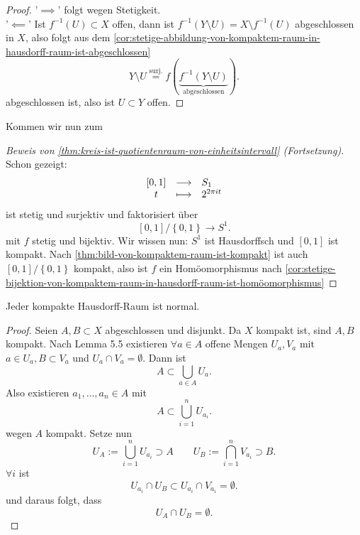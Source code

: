 \begin{proof}
    '$\implies$' folgt wegen Stetigkeit. \\
    '$\impliedby$' Ist $f^{-1}(U) \subset X$ offen, dann ist $f^{-1}(Y \setminus U ) = X \setminus f^{-1}(U)$ abgeschlossen in $X$, also folgt aus dem \autoref{cor:stetige-abbildung-von-kompaktem-raum-in-hausdorff-raum-ist-abgeschlossen}
     \[
         Y \setminus U \stackrel{\text{surj.}}{=}   f\left( \underbrace{f^{-1}\left( Y \setminus U \right)}_{\text{abgeschlossen}}  \right) 
    .\] 
    abgeschlossen ist, also ist $U\subset Y$ offen.
\end{proof}
Kommen wir nun zum
\begin{proof}[Beweis von \autoref{thm:kreis-ist-quotientenraum-von-einheitsintervall} (Fortsetzung)]
    Schon gezeigt:
        \begin{equation*}
        \begin{array}{c c l} 
            [0,1] & \longrightarrow & S_1 \\
        t & \longmapsto &  2^{2\pi it}
        \end{array}
    \end{equation*}
    ist stetig und surjektiv und faktorisiert über
    \[
        [0,1] /\left \{0,1\right\}  \to  S^1
    .\] 
    mit $f$ stetig und bijektiv. Wir wissen nun:  $S^1$ ist Hausdorffsch und  $[0,1]$ ist kompakt. Nach \autoref{thm:bild-von-kompaktem-raum-ist-kompakt} ist auch  $[0,1] /\left \{0,1\right\} $ kompakt, also ist $f$ ein Homöomorphismus nach \autoref{cor:stetige-bijektion-von-kompaktem-raum-in-hausdorff-raum-ist-homöomorphismus}
\end{proof}


\begin{theorem}\label{thm:kompakter-hausdorff-raum-ist-normal}
    Jeder kompakte Hausdorff-Raum ist normal.
\end{theorem}
\begin{proof}
    Seien $A,B\subset X$ abgeschlossen und disjunkt. Da $X$ kompakt ist, sind  $A,B$ kompakt. Nach Lemma 5.5 existieren  $\forall a\in A$ offene Mengen $U_a, V_a$ mit $a\in U_a, B\subset V_a$ und $U_a \cap V_a = \emptyset$. Dann ist
    \[
    A \subset \bigcup_{a\in A} U_a
    .\] 
    Also existieren $a_1,\ldots,a_n\in A$ mit
    \[
    A\subset \bigcup_{i=1}^n U_{a_i}
    .\] 
    wegen $A$ kompakt. Setze nun
    \[
    U_A := \bigcup_{i=1}^n U_{a_i}\supset A \qquad U_B := \bigcap_{i=1}^n V_{a_i}\supset B
    .\] 
$\forall i$ ist 
\[
    U_{a_i} \cap U_B \subset U_{a_i} \cap V_{a_i} = \emptyset
.\] 
und daraus folgt, dass
\[
U_A \cap U_B = \emptyset
.\] 
\end{proof}

